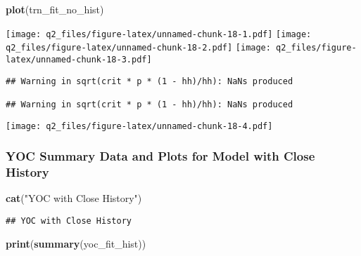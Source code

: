 \documentclass[]{article}
\newenvironment{Shaded}{\begin{snugshade}}{\end{snugshade}}
\newcommand{\KeywordTok}[1]{\textcolor[rgb]{0.13,0.29,0.53}{\textbf{#1}}}
\newcommand{\StringTok}[1]{\textcolor[rgb]{0.31,0.60,0.02}{#1}}
\newcommand{\NormalTok}[1]{#1}
\begin{document}
\begin{Shaded}
\begin{Highlighting}[]
\KeywordTok{plot}\NormalTok{(trn_fit_no_hist)}
\end{Highlighting}
\end{Shaded}

\texttt{[image: q2\_files/figure-latex/unnamed-chunk-18-1.pdf]}
\texttt{[image: q2\_files/figure-latex/unnamed-chunk-18-2.pdf]}
\texttt{[image: q2\_files/figure-latex/unnamed-chunk-18-3.pdf]}

\begin{verbatim}
## Warning in sqrt(crit * p * (1 - hh)/hh): NaNs produced

## Warning in sqrt(crit * p * (1 - hh)/hh): NaNs produced
\end{verbatim}

\texttt{[image: q2\_files/figure-latex/unnamed-chunk-18-4.pdf]}

\subsubsection{YOC Summary Data and Plots for Model with Close
History}\label{yoc-summary-data-and-plots-for-model-with-close-history}

\begin{Shaded}
\begin{Highlighting}[]
\KeywordTok{cat}\NormalTok{(}\StringTok{"YOC with Close History"}\NormalTok{)}
\end{Highlighting}
\end{Shaded}

\begin{verbatim}
## YOC with Close History
\end{verbatim}

\begin{Shaded}
\begin{Highlighting}[]
\KeywordTok{print}\NormalTok{(}\KeywordTok{summary}\NormalTok{(yoc_fit_hist))}
\end{Highlighting}
\end{Shaded}
\end{document}
